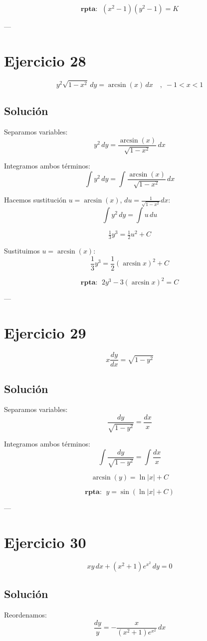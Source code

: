 \documentclass[12pt,a4paper]{article}
\begin{document}
\begin{multicols}{2}
\[
\textbf{rpta: } \; (x^2-1)(y^2-1) = K
\]

---

\section*{Ejercicio 28}
\[
y^2\sqrt{1-x^2}\,dy=\arcsin(x)\,dx \quad , \; -1<x<1
\]

\subsection*{Solución}
Separamos variables:
\[
y^2\,dy = \frac{\arcsin(x)}{\sqrt{1-x^2}}\,dx
\]

Integramos ambos términos:
\[
\int y^2\,dy = \int \frac{\arcsin(x)}{\sqrt{1-x^2}}\,dx
\]

Hacemos sustitución $u=\arcsin(x)$, $du=\tfrac{1}{\sqrt{1-x^2}}dx$:
\[
\int y^2\,dy = \int u\,du
\]

\[
\tfrac{1}{3}y^3 = \tfrac{1}{2}u^2 + C
\]

Sustituimos $u=\arcsin(x)$:
\[
\frac{1}{3}y^3 = \frac{1}{2}(\arcsin x)^2 + C
\]

\[
\textbf{rpta: } \; 2y^3 - 3(\arcsin x)^2 = C
\]

---

\section*{Ejercicio 29}
\[
x\frac{dy}{dx} = \sqrt{1-y^2}
\]

\subsection*{Solución}
Separamos variables:
\[
\frac{dy}{\sqrt{1-y^2}} = \frac{dx}{x}
\]

Integramos ambos términos:
\[
\int \frac{dy}{\sqrt{1-y^2}} = \int \frac{dx}{x}
\]

\[
\arcsin(y) = \ln|x| + C
\]

\[
\textbf{rpta: } \; y = \sin(\ln|x|+C)
\]

---

\section*{Ejercicio 30}
\[
x y\,dx + (x^2+1)e^{x^2}\,dy=0
\]

\subsection*{Solución}
Reordenamos:
\[
\frac{dy}{y} = -\frac{x}{(x^2+1)e^{x^2}}\,dx
\]


\end{multicols}
\end{document}

